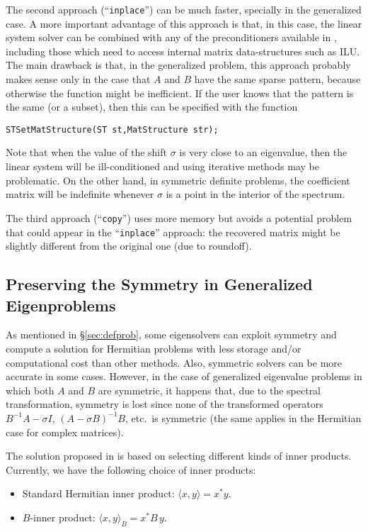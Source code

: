 	The second approach (``\Verb!inplace!'') can be much faster, specially in the generalized case. A more important advantage of this approach is that, in this case, the linear system solver can be combined with any of the preconditioners available in \petsc, including those which need to access internal matrix data-structures such as ILU. The main drawback is that, in the generalized problem, this approach probably makes sense only in the case that $A$ and $B$ have the same sparse pattern, because otherwise the function  might be inefficient.
If the user knows that the pattern is the same (or a subset), then this can be specified with the function
	\begin{Verbatim}[fontsize=\small]
	STSetMatStructure(ST st,MatStructure str);
	\end{Verbatim}
	
	Note that when the value of the shift $\sigma$ is very close to an eigenvalue, then the linear system will be ill-conditioned and using iterative methods may be problematic. On the other hand, in symmetric definite problems, the coefficient matrix will be indefinite whenever $\sigma$ is a point in the interior of the spectrum.

	The third approach (``\Verb!copy!'') uses more memory but avoids a potential problem that could appear in the ``\Verb!inplace!'' approach: the recovered matrix might be slightly different from the original one (due to roundoff).

\subsection{Preserving the Symmetry in Generalized Eigenproblems}
\label{sec:symm}

	As mentioned in \S\ref{sec:defprob}, some eigensolvers can exploit symmetry and compute a solution for Hermitian problems with less storage and/or computational cost than other methods. Also, symmetric solvers can be more accurate in some cases. However, in the case of generalized eigenvalue problems in which both $A$ and $B$ are symmetric, it happens that, due to the spectral transformation, symmetry is lost since none of the transformed operators $B^{-1}\!A-\sigma I$, $(A-\sigma B)^{-1}B$, etc.\ is symmetric (the same applies in the Hermitian case for complex matrices).

	The solution proposed in \slepc is based on selecting different kinds of inner products. Currently, we have the following choice of inner products:
  \begin{itemize}\setlength{\itemsep}{0pt}
    \item Standard Hermitian inner product: $\langle x,y\rangle=x^*y$.
    \item $B$-inner product: $\langle x,y\rangle_B=x^*\!B\,y$.
  \end{itemize}

